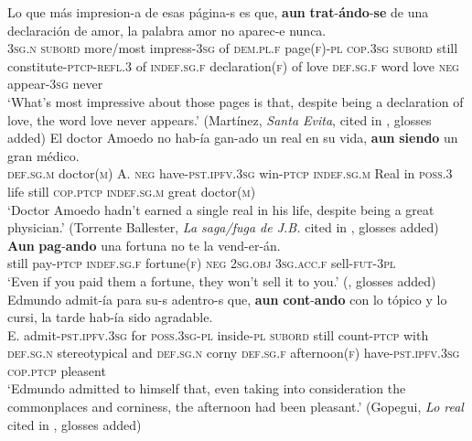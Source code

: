\begin{exe}
	\ex\label{exAppendixSpanishAunGerundConcessive1}
	\gll Lo que más impresion-a de esas página-s es que, \textbf{aun} \textbf{trat}-\textbf{ándo}-\textbf{se} de una declaración de amor, la palabra amor no aparec-e nunca.\\
		3\textsc{sg}.\textsc{n} \textsc{subord} more/most impress-3\textsc{sg} of \textsc{dem}.\textsc{pl}.\textsc{f} page(\textsc{f})-\textsc{pl} \textsc{cop}.3\textsc{sg} \textsc{subord} still constitute-\textsc{ptcp}-\textsc{refl}.3 of \textsc{indef}.\textsc{sg}.\textsc{f} declaration(\textsc{f}) of love \textsc{def}.\textsc{sg}.\textsc{f} word love \textsc{neg} appear-3\textsc{sg} never\\
	\glt \lq What’s most impressive about those pages is that, despite being a declaration of love, the word love never appears.' (Martínez, \textit{Santa Evita}, cited in \cite[§27.5i]{RAEGramatica}, glosses added)
		\ex\label{exAppendixSpanishAunGerundConcessive2}
	\gll El doctor Amoedo no hab-ía gan-ado un real en su vida, \textbf{aun} \textbf{siendo} un gran médico.\\
	\textsc{def}.\textsc{sg}.\textsc{m} doctor(\textsc{m}) A. \textsc{neg} have-\textsc{pst}.\textsc{ipfv}.3\textsc{sg} win-\textsc{ptcp} \textsc{indef}.\textsc{sg}.\textsc{m} Real in \textsc{poss}.3 life still \textsc{cop}.\textsc{ptcp} \textsc{indef}.\textsc{sg}.\textsc{m} great doctor(\textsc{m})\\
	\glt \lq Doctor Amoedo hadn’t earned a single real in his life, despite being a great physician.' (Torrente Ballester, \textit{La saga/fuga de J.B.} cited in \cite[§27.5i]{RAEGramatica}, glosses added)
	\ex\label{exAppendixSpanishAunGerundConcessive3}
	\gll \textbf{Aun} \textbf{pag}-\textbf{ando} una fortuna no te la vend-er-án.\\
	still pay-\textsc{ptcp} \textsc{indef}.\textsc{sg}.\textsc{f} fortune(\textsc{f}) \textsc{neg} 2\textsc{sg}.\textsc{obj} 3\textsc{sg}.\textsc{acc}.\textsc{f} sell-\textsc{fut}-3\textsc{pl}\\
	\glt \lq Even if you paid them a fortune, they won't sell it to you.\rq{ }(\cite[40]{FerrariEtAl2011}, glosses added)
		\ex\label{exAppendixSpanishAunGerundConcessive4}
	\gll Edmundo admit-ía para su-s adentro-s que, \textbf{aun} \textbf{cont}-\textbf{ando} con lo tópico y lo cursi, la tarde hab-ía sido agradable.\\
	E. admit-\textsc{pst}.\textsc{ipfv}.3\textsc{sg} for \textsc{poss}.3\textsc{sg}-\textsc{pl} inside-\textsc{pl} \textsc{subord} still count-\textsc{ptcp} with \textsc{def}.\textsc{sg}.\textsc{n} stereotypical and \textsc{def}.\textsc{sg}.\textsc{n} corny \textsc{def}.\textsc{sg}.\textsc{f} afternoon(\textsc{f}) have-\textsc{pst}.\textsc{ipfv}.3\textsc{sg} \textsc{cop}.\textsc{ptcp} pleasent\\
	\glt \lq Edmundo admitted to himself that, even taking into consideration the commonplaces and corniness, the afternoon had been pleasant.'
	(Gopegui, \textit{Lo real} cited in \cite[§27.5i]{RAEGramatica}, glosses added)
\end{exe}

